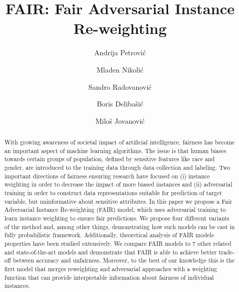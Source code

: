 \documentclass[preprint,12pt]{elsarticle}
\begin{document}
\begin{frontmatter}



\title{FAIR: Fair Adversarial Instance Re-weighting}
\tnotetext[label1]{}


\author[FON]{Andrija Petrović}
\author[MATF]{Mladen Nikolić}
\author[FON]{Sandro Radovanović}
\author[FON]{Boris Delibašić}
\author[FON]{Miloš Jovanović}

\address[FON]{University of Belgrade - Faculty of Organizational Sciences, Jove Ilica 154, Belgrade, Serbia}
\address[MATF]{University of Belgrade - Faculty of Mathematics, Studentski Trg 16, Belgrade, Serbia}



\begin{abstract}
With growing awareness of societal impact of artificial intelligence, fairness has become an important aspect of machine learning algorithms. The issue is that human biases towards certain groups of population, defined by sensitive features like race and gender, are introduced to the training data through data collection and labeling. Two important directions of fairness ensuring research have focused on (i) instance weighting in order to decrease the impact of more biased instances and (ii) adversarial training in order to construct data representations suitable for prediction of target variable, but uninformative about sensitive attributes. In this paper we propose a Fair Adversarial Instance Re-weighting (FAIR) model, which uses adversarial training to learn instance weighting to ensure fair predictions. We propose four different variants of the method and, among other things, demonstrating how such models can be cast in fully probabilistic framework. Additionally, theoretical analysis of FAIR models properties have been studied extensively. We compare FAIR models to 7 other related and state-of-the-art models and demonstrate that FAIR is able to achieve better trade-off between accuracy and unfairness. Moreover, to the best of our knowledge this is the first model that merges reweighting and adversarial approaches with a weighting function that can provide interpretable information about fairness of individual instances.
\end{abstract}



\end{frontmatter}
\end{document}
